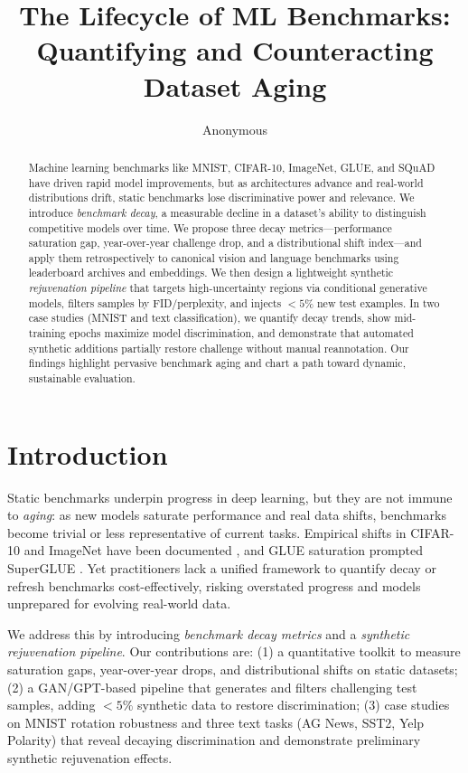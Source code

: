 \documentclass{article} %
\title{The Lifecycle of ML Benchmarks: Quantifying and Counteracting Dataset Aging}
\author{Anonymous}
\begin{document}
\maketitle

\begin{abstract}
Machine learning benchmarks like MNIST, CIFAR-10, ImageNet, GLUE, and SQuAD have driven rapid model improvements, but as architectures advance and real-world distributions drift, static benchmarks lose discriminative power and relevance. We introduce \emph{benchmark decay}, a measurable decline in a dataset's ability to distinguish competitive models over time. We propose three decay metrics—performance saturation gap, year-over-year challenge drop, and a distributional shift index—and apply them retrospectively to canonical vision and language benchmarks using leaderboard archives and embeddings. We then design a lightweight synthetic \emph{rejuvenation pipeline} that targets high-uncertainty regions via conditional generative models, filters samples by FID/perplexity, and injects $<5\%$ new test examples. In two case studies (MNIST and text classification), we quantify decay trends, show mid-training epochs maximize model discrimination, and demonstrate that automated synthetic additions partially restore challenge without manual reannotation. Our findings highlight pervasive benchmark aging and chart a path toward dynamic, sustainable evaluation.
\end{abstract}

\section{Introduction}
Static benchmarks underpin progress in deep learning, but they are not immune to \emph{aging}: as new models saturate performance and real data shifts, benchmarks become trivial or less representative of current tasks. Empirical shifts in CIFAR-10 and ImageNet have been documented \citep{recht2019doic}, and GLUE saturation prompted SuperGLUE \citep{wang2019superglueas}. Yet practitioners lack a unified framework to quantify decay or refresh benchmarks cost-effectively, risking overstated progress and models unprepared for evolving real-world data.

We address this by introducing \emph{benchmark decay metrics} and a \emph{synthetic rejuvenation pipeline}. Our contributions are: (1) a quantitative toolkit to measure saturation gaps, year-over-year drops, and distributional shifts on static datasets; (2) a GAN/GPT-based pipeline that generates and filters challenging test samples, adding $<5\%$ synthetic data to restore discrimination; (3) case studies on MNIST rotation robustness and three text tasks (AG News, SST2, Yelp Polarity) that reveal decaying discrimination and demonstrate preliminary synthetic rejuvenation effects.
\end{document}

